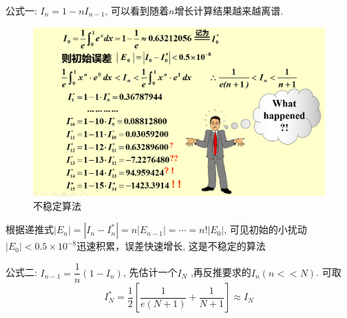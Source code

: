 \documentclass[lang=cn,newtx,12pt,scheme=chinese]{elegantbook}
\begin{document}
公式一: $I_n=1-nI_{n-1}$, 可以看到随着$n$增长计算结果越来越离谱.
\begin{figure}[H]
	\centering
	\includegraphics[width=0.7\linewidth]{image/误差2}
	\caption{不稳定算法}
	\label{fig:2}
\end{figure}
根据递推式$|E_n|=|I_n-I_n^*|=n|E_{n-1}|=\cdots=n!|E_0| $, 可见初始的小扰动$|E_0|<0.5\times10^{-8}$迅速积累，误差快速增长, 这是不稳定的算法 

公式二: $I_{n-1}=\dfrac{1}{n}(1-I_n)$, 先估计一个$I_N$ ,再反推要求的$I_n(n << N )$. 可取\[ 
I_N^*=\dfrac{1}{2}[\dfrac{1}{e(N+1)}+\dfrac{1}{N+1}]\approx I_N
 \]
 
\end{document}
